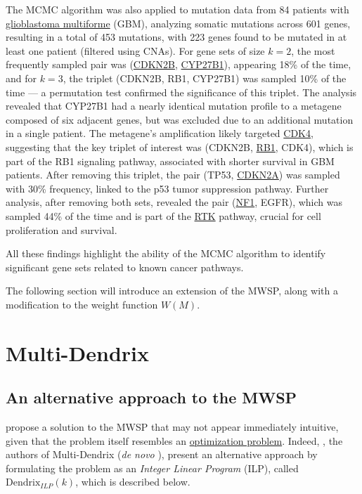 The MCMC algorithm was also applied to mutation data from 84 patients with \href{https://en.wikipedia.org/wiki/Glioblastoma}{glioblastoma multiforme} (GBM), analyzing somatic mutations across 601 genes, resulting in a total of 453 mutations, with 223 genes found to be mutated in at least one patient (filtered using CNAs). For gene sets of size $k = 2$, the most frequently sampled pair was (\href{https://www.ncbi.nlm.nih.gov/gene/1030}{CDKN2B}, \href{https://www.ncbi.nlm.nih.gov/gene/1594}{CYP27B1}), appearing 18\% of the time, and for $k = 3$, the triplet (CDKN2B, RB1, CYP27B1) was sampled 10\% of the time --- a permutation test confirmed the significance of this triplet. The analysis revealed that CYP27B1 had a nearly identical mutation profile to a metagene composed of six adjacent genes, but was excluded due to an additional mutation in a single patient. The metagene's amplification likely targeted \href{https://www.ncbi.nlm.nih.gov/gene/1019}{CDK4}, suggesting that the key triplet of interest was (CDKN2B, \href{https://www.ncbi.nlm.nih.gov/gene/5925}{RB1}, CDK4), which is part of the RB1 signaling pathway, associated with shorter survival in GBM patients. After removing this triplet, the pair (TP53, \href{https://www.ncbi.nlm.nih.gov/gene/1029}{CDKN2A}) was sampled with 30\% frequency, linked to the p53 tumor suppression pathway. Further analysis, after removing both sets, revealed the pair (\href{https://www.ncbi.nlm.nih.gov/gene/4763}{NF1}, EGFR), which was sampled 44\% of the time and is part of the \href{https://en.wikipedia.org/wiki/Receptor_tyrosine_kinase}{RTK} pathway, crucial for cell proliferation and survival.

All these findings highlight the ability of the MCMC algorithm to identify significant gene sets related to known cancer pathways.

The following section will introduce an extension of the MWSP, along with a modification to the weight function $W(M)$.

\section{Multi-Dendrix}

\subsection{An alternative approach to the MWSP} \label{multi-dendrix_chap3_first_sect}

\textcite{dendrix} propose a solution to the MWSP that may not appear immediately intuitive, given that the problem itself resembles an \href{https://en.wikipedia.org/wiki/Optimization_problem}{optimization problem}. Indeed, \textcite{multi-dendrix}, the authors of Multi-Dendrix (\textit{de novo} \cite{survey}), present an alternative approach by formulating the problem as an \textit{Integer Linear Program} (ILP), called $\mathrm{Dendrix}_{\mathrm{\textit{ILP}}}(k)$, which is described below. 

